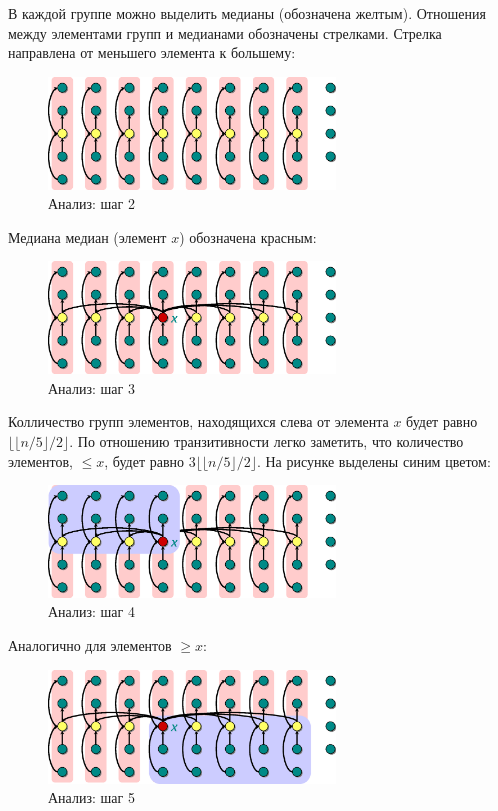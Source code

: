 \documentclass[11pt]{article}
\begin{document}
В каждой группе можно выделить медианы (обозначена желтым). Отношения между элементами групп и медианами обозначены стрелками. Стрелка направлена от меньшего элемента к большему:
\begin{figure}[ht]
  \centering
  \includegraphics[width=3in]{lecture6/analysis2.eps}
  \caption{Анализ: шаг 2}
  \label{fig:analysis2}
\end{figure}

Медиана медиан (элемент $x$) обозначена красным:
\begin{figure}[ht]
  \centering
  \includegraphics[width=3in]{lecture6/analysis3.eps}
  \caption{Анализ: шаг 3}
  \label{fig:analysis3}
\end{figure}

Колличество групп элементов, находящихся слева от элемента $x$ будет равно $\lfloor {\lfloor n/5 \rfloor} /2 \rfloor$. По отношению транзитивности легко заметить, что количество элементов, $\leqslant x$, будет равно $3 \lfloor {\lfloor n/5 \rfloor} /2 \rfloor$. На рисунке выделены синим цветом:
\begin{figure}[ht]
  \centering
  \includegraphics[width=3in]{lecture6/analysis4.eps}
  \caption{Анализ: шаг 4}
  \label{fig:analysis4}
\end{figure}

Аналогично для элементов $\geqslant x$:
\begin{figure}[ht]
  \centering
  \includegraphics[width=3in]{lecture6/analysis5.eps}
  \caption{Анализ: шаг 5}
  \label{fig:analysis5}
\end{figure}
\end{document}
